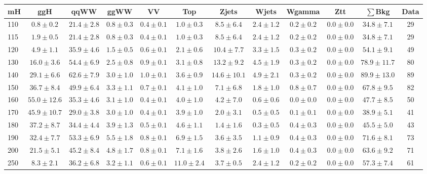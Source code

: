 \begin{table}[!ht]
{\tiny
 \begin{center}
 \begin{tabular}{l c c c c c c c c c c c }
 \hline
 mH & ggH & qqWW & ggWW & VV & Top & Zjets & Wjets & Wgamma & Ztt & $\sum$Bkg & Data \\
 \hline
110 & $0.8\pm0.2$ & $21.4\pm2.8$ & $0.8\pm0.3$ & $0.4\pm0.1$ & $1.0\pm0.3$ & $8.5\pm6.4$ & $2.4\pm1.2$ & $0.2\pm0.2$ & $0.0\pm0.0$ & $34.8\pm7.1$ & 29 \\
115 & $1.9\pm0.5$ & $21.4\pm2.8$ & $0.8\pm0.3$ & $0.4\pm0.1$ & $1.0\pm0.3$ & $8.5\pm6.4$ & $2.4\pm1.2$ & $0.2\pm0.2$ & $0.0\pm0.0$ & $34.8\pm7.1$ & 29 \\
120 & $4.9\pm1.1$ & $35.9\pm4.6$ & $1.5\pm0.5$ & $0.6\pm0.1$ & $2.1\pm0.6$ & $10.4\pm7.7$ & $3.3\pm1.5$ & $0.3\pm0.2$ & $0.0\pm0.0$ & $54.1\pm9.1$ & 49 \\
130 & $16.0\pm3.6$ & $54.4\pm6.9$ & $2.5\pm0.8$ & $0.9\pm0.1$ & $3.1\pm0.8$ & $13.2\pm9.2$ & $4.5\pm1.9$ & $0.3\pm0.2$ & $0.0\pm0.0$ & $78.9\pm11.7$ & 80 \\
140 & $29.1\pm6.6$ & $62.6\pm7.9$ & $3.0\pm1.0$ & $1.0\pm0.1$ & $3.6\pm0.9$ & $14.6\pm10.1$ & $4.9\pm2.1$ & $0.3\pm0.2$ & $0.0\pm0.0$ & $89.9\pm13.0$ & 89 \\
150 & $36.7\pm8.4$ & $49.9\pm6.4$ & $3.3\pm1.1$ & $0.7\pm0.1$ & $4.1\pm1.0$ & $7.1\pm6.8$ & $1.8\pm1.0$ & $0.8\pm0.7$ & $0.0\pm0.0$ & $67.8\pm9.5$ & 82 \\
160 & $55.0\pm12.6$ & $35.3\pm4.6$ & $3.1\pm1.0$ & $0.4\pm0.1$ & $4.0\pm1.0$ & $4.2\pm7.0$ & $0.6\pm0.6$ & $0.0\pm0.0$ & $0.0\pm0.0$ & $47.7\pm8.5$ & 50 \\
170 & $45.9\pm10.7$ & $29.0\pm3.8$ & $3.0\pm1.0$ & $0.4\pm0.1$ & $3.9\pm1.0$ & $2.0\pm3.1$ & $0.5\pm0.5$ & $0.1\pm0.1$ & $0.0\pm0.0$ & $38.9\pm5.1$ & 41 \\
180 & $37.2\pm8.7$ & $34.4\pm4.4$ & $3.9\pm1.3$ & $0.5\pm0.1$ & $4.6\pm1.1$ & $1.4\pm1.6$ & $0.3\pm0.5$ & $0.4\pm0.3$ & $0.0\pm0.0$ & $45.5\pm5.0$ & 43 \\
190 & $32.4\pm7.7$ & $53.3\pm6.9$ & $5.5\pm1.8$ & $0.8\pm0.1$ & $6.9\pm1.5$ & $3.6\pm3.5$ & $1.1\pm0.9$ & $0.4\pm0.3$ & $0.0\pm0.0$ & $71.6\pm8.1$ & 73 \\
200 & $21.5\pm5.1$ & $45.2\pm8.4$ & $4.8\pm1.7$ & $0.8\pm0.1$ & $7.1\pm1.6$ & $3.8\pm2.6$ & $1.6\pm1.0$ & $0.4\pm0.3$ & $0.0\pm0.0$ & $63.6\pm9.2$ & 71 \\
250 & $8.3\pm2.1$ & $36.2\pm6.8$ & $3.2\pm1.1$ & $0.6\pm0.1$ & $11.0\pm2.4$ & $3.7\pm0.5$ & $2.4\pm1.2$ & $0.2\pm0.2$ & $0.0\pm0.0$ & $57.3\pm7.4$ & 61 \\

\end{tabular}
\end{center}}
\end{table}

